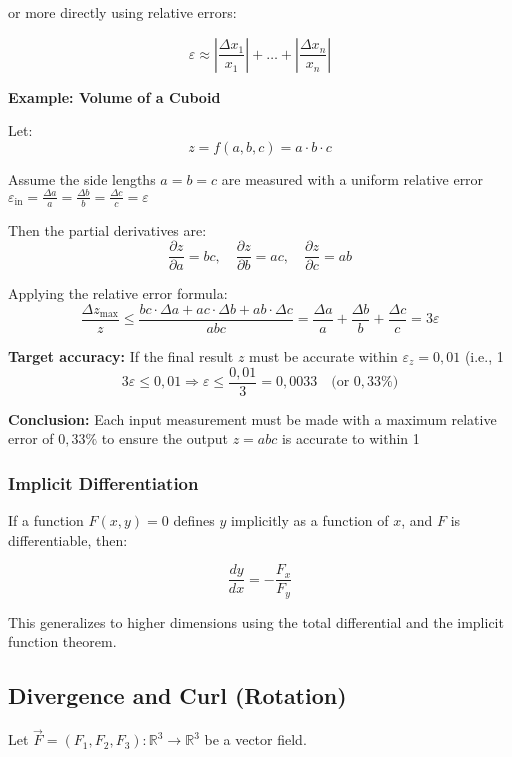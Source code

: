 or more directly using relative errors:

\[
\varepsilon \approx \left| \frac{\Delta x_1}{x_1} \right| + \dots + \left| \frac{\Delta x_n}{x_n} \right|
\]

\textbf{Example: Volume of a Cuboid}

Let:
\[
z = f(a, b, c) = a \cdot b \cdot c
\]

Assume the side lengths \( a = b = c \) are measured with a uniform relative error \( \varepsilon_{\text{in}} = \frac{\Delta a}{a} = \frac{\Delta b}{b} = \frac{\Delta c}{c} = \varepsilon \)

Then the partial derivatives are:
\[
\frac{\partial z}{\partial a} = b c, \quad
\frac{\partial z}{\partial b} = a c, \quad
\frac{\partial z}{\partial c} = a b
\]

Applying the relative error formula:
\[
\frac{\Delta z_{\max}}{z} \leq \frac{bc \cdot \Delta a + ac \cdot \Delta b + ab \cdot \Delta c}{abc}
= \frac{\Delta a}{a} + \frac{\Delta b}{b} + \frac{\Delta c}{c} = 3 \varepsilon
\]

\textbf{Target accuracy:}  
If the final result \( z \) must be accurate within \( \varepsilon_z = 0{,}01 \) (i.e., 1%
\[
3 \varepsilon \leq 0{,}01 \Rightarrow \varepsilon \leq \frac{0{,}01}{3} = \boxed{0{,}0033} \quad \text{(or } 0{,}33\% \text{)}
\]

\textbf{Conclusion:}  
Each input measurement must be made with a maximum relative error of \( \boxed{0{,}33\%} \) to ensure the output \( z = abc \) is accurate to within 1%

\subsubsection{Implicit Differentiation}

If a function \( F(x, y) = 0 \) defines \( y \) implicitly as a function of \( x \), and \( F \) is differentiable, then:

\[
\frac{dy}{dx} = -\frac{F_x}{F_y}
\]

This generalizes to higher dimensions using the total differential and the implicit function theorem.


\subsection{Divergence and Curl (Rotation)}

Let \( \vec{F} = (F_1, F_2, F_3) : \mathbb{R}^3 \to \mathbb{R}^3 \) be a vector field.

